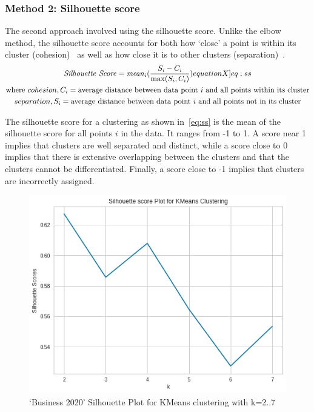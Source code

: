 \vspace*{-1ex}
\subsubsection{Method 2: Silhouette score} \label{s:silhouette score}

The second approach involved using the silhouette score. Unlike the elbow method, the silhouette score accounts for both how `close' a point is within its cluster (cohesion)~\cite{elbowvssil} as well as how close it is to other clusters (separation)~\cite{silhouette}.
\begin{gather}
  \mathit{Silhouette \ Score} = \mathit{mean}_i (\frac{S_i - C_i}{\max(S_i, C_i)}) \label[equationX]{eq:ss} \\
  \text{where~$cohesion, C_i$} = \text{average distance between data point~$i$ and all points within its cluster} \nonumber \\
  \text{$separation, S_i$} = \text{average distance between data point~$i$ and all points not in its cluster}\nonumber
\end{gather}

The silhouette score for a clustering as shown in~\ref{eq:ss} is the mean of the silhouette score for all points $i$ in the data. It ranges from -1 to 1. A score near 1 implies that clusters are well separated and distinct, while a score close to 0 implies that there is extensive overlapping between the clusters and that the clusters cannot be differentiated. Finally, a score close to -1 implies that clusters are incorrectly assigned.

\begin{figure}[H]
\centering
\includegraphics[width=0.4\linewidth]{images/sil_kmeans_.png}
\caption{`Business 2020' Silhouette Plot for KMeans clustering with k=2..7}
\label{fig:sil_kmeans}
\end{figure}
\vspace{-2ex}

